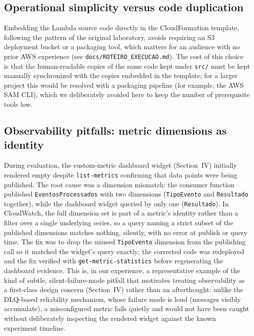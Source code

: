 \documentclass[conference]{IEEEtran}
\begin{document}
\subsection{Operational simplicity versus code duplication}
Embedding the Lambda source code directly in the CloudFormation template, following the pattern of the original laboratory, avoids requiring an S3 deployment bucket or a packaging tool, which matters for an audience with no prior AWS experience (see \texttt{docs/ROTEIRO\_EXECUCAO.md}). The cost of this choice is that the human-readable copies of the same code kept under \texttt{src/} must be kept manually synchronized with the copies embedded in the template; for a larger project this would be resolved with a packaging pipeline (for example, the AWS SAM CLI), which we deliberately avoided here to keep the number of prerequisite tools low.

\subsection{Observability pitfalls: metric dimensions as identity}
During evaluation, the custom-metric dashboard widget (Section~IV) initially rendered empty despite \texttt{list-metrics} confirming that data points were being published. The root cause was a dimension mismatch: the consumer function published \texttt{EventosProcessados} with two dimensions (\texttt{TipoEvento} and \texttt{Resultado} together), while the dashboard widget queried by only one (\texttt{Resultado}). In CloudWatch, the full dimension set is part of a metric's identity rather than a filter over a single underlying series, so a query naming a strict subset of the published dimensions matches nothing, silently, with no error at publish or query time. The fix was to drop the unused \texttt{TipoEvento} dimension from the publishing call so it matched the widget's query exactly; the corrected code was redeployed and the fix verified with \texttt{get-metric-statistics} before regenerating the dashboard evidence. This is, in our experience, a representative example of the kind of subtle, silent-failure-mode pitfall that motivates treating observability as a first-class design concern (Section~IV) rather than an afterthought: unlike the DLQ-based reliability mechanism, whose failure mode is loud (messages visibly accumulate), a misconfigured metric fails quietly and would not have been caught without deliberately inspecting the rendered widget against the known experiment timeline.
\end{document}
